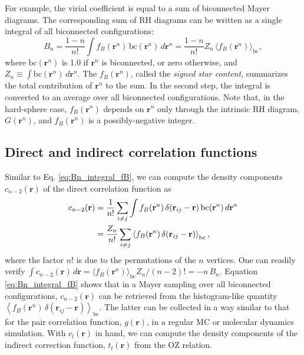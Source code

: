 \documentclass[aip,jcp,preprint,superscriptaddress,showpacs,preprintnumbers,amsmath,amssymb]{revtex4-1}
\numberwithin{equation}{section}
\newcommand{\vct}[1]{\mathbf{#1}}
\providecommand{\vr}{} %
\renewcommand{\vr}{\vct{r}}
\begin{document}
For example,
the virial coefficient is equal to
a sum of biconnected Mayer diagrams.
%
The corresponding sum of RH diagrams can be written as
a single integral of all biconnected configurations:
%
%
%
\begin{equation}
B_n =
\frac{1 - n}{n!}
\int
f_B(\vr^n) \, \mathrm{bc}(\vr^n) \, d\vr^n
=
\frac{1-n}{n!}
Z_n \,
\langle f_B(\vr^n) \rangle_\mathrm{bc},
\label{eq:Bn_integral_fB}
\end{equation}
%
%
%
where $\mathrm{bc}(\vr^n)$ is 1.0
if $\vr^n$ is biconnected,
or zero otherwise,
and $Z_n \equiv \int \mathrm{bc}(\vr^n) \, d\vr^n$.
%
The $f_B(\vr^n)$,
called the \emph{signed star content},
summarizes the total contribution of $\vr^n$
to the sum\cite{uhlenbeck1962, hansen}.
%
In the second step,
the integral is converted to an average
over all biconnected configurations\cite{zhang2014}.
%
Note that,
in the hard-sphere case,
$f_B(\vr^n)$ depends on $\vr^n$
only through the intrinsic RH diagram, $G(\vr^n)$,
and $f_B(\vr^n)$ is a possibly-negative integer.





\subsection{Direct and indirect correlation functions}





Similar to Eq. \eqref{eq:Bn_integral_fB},
we can compute the density components $c_{n-2}(\vr)$
of the direct correlation function as
%
%
%
\begin{align}
c_{n-2}(\vr)
&=
\frac{1}{n!}
\sum_{i \ne j}
\int
  f_B(\vr^n) \, \delta(\vr_{ij} - \vr) \,
  \mathrm{bc}(\vr^n) \, d\vr^n
\notag \\
&=
\frac{Z_n}{n!}
\sum_{i \ne j}
\left\langle
  f_B(\vr^n) \,
  \delta(\vr_{ij} - \vr)
\right\rangle_{\mathrm{bc}},
\label{eq:cr_mayer}
\end{align}
%
%
%
where the factor $n!$ is due to the permutations of
the $n$ vertices.
%
One can readily verify
%
%
%
%
%
%
$\int c_{n-2}(\vr) \, d\vr
= \langle f_B(\vr^n) \rangle_\mathrm{bc}
Z_n / (n - 2)! = -n \, B_n$.
%
%
%
Equation \eqref{eq:Bn_integral_fB}
shows that in a Mayer sampling over
all biconnected configurations,
$c_{n-2}(\vr)$ can be retrieved from
the histogram-like quantity
$\left\langle
  f_B(\vr^n) \, \delta(\vr_{ij} - \vr)
\right\rangle_\mathrm{bc}$.
%
The latter can be collected in a way
similar to that for the pair correlation function, $g(\vr)$,
in a regular MC or molecular dynamics simulation.
%
With $c_l(\vr)$ in hand,
we can compute the density components of
the indirect correction function, $t_l(\vr)$
from the OZ relation.
\end{document}

